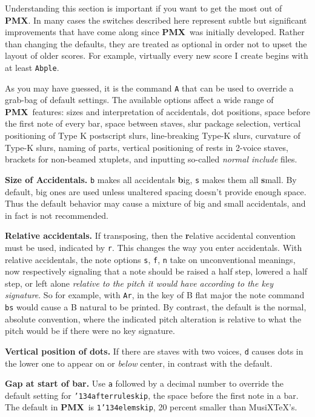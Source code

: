 \documentclass[11pt]{article}
\def\MusiXTeX{MusiX\TeX}
\def\bs{{\tt\char'134}}
\newcommand\PMXX{\textbf{PMX}}
\newcommand\PMX{\PMXX~}
\def\newfrom{2.59}  %
\def\NEW#1{\ifdim#1 pt<\newfrom pt\else%
\marginpar{\fbox{#1}}\fi}
\begin{document}
Understanding this section is important if you want to get the most out 
of \PMXX. In many 
cases the switches described here represent subtle but significant 
improvements that have come along since \PMX was initially developed. Rather 
than changing the defaults, they are treated as optional in order not to 
upset the layout of older scores. For example, virtually every new score I 
create begins with at least {\tt Abple}.

As you may have guessed, it is the command {\tt A} that can be used to 
override a grab-bag of default settings. The available options affect a 
wide range of \PMX features: sizes 
and interpretation of accidentals,
dot positions, space before the first note of every bar, space between staves,
slur package selection, vertical positioning of Type K postscript 
slurs, line-breaking Type-K slurs, curvature of Type-K slurs, 
naming of parts, vertical positioning of rests in 2-voice staves\NEW{2.6}, 
brackets for non-beamed xtuplets, and inputting so-called 
{\it normal include} files.

{\bf Size of Accidentals.}
{\tt b} makes all accidentals 
{\bf b}ig, {\tt s} makes them all {\bf s}mall.  By default, big ones are used 
unless unaltered spacing doesn't provide enough space.  Thus the default 
behavior may cause a mixture of big and small accidentals, and in fact is not
recommended.

{\bf Relative accidentals.}\label{ArDirective}
If transposing, then the {\bf r}elative accidental convention must be used, 
indicated by {\tt r}.  This changes the way you enter accidentals. With 
relative accidentals, the note options {\tt s}, {\tt f}, {\tt n} take on 
unconventional meanings, now respectively signaling that a note should be raised 
a half step, lowered a half step, or left alone {\it relative to the pitch 
it would have according to the key signature}. So for example, with {\tt Ar}, 
in the key of B flat major the note command {\tt bs} would cause a B natural 
to be printed. By contrast, the default is 
the normal, absolute convention, where the indicated pitch alteration is
relative to what the pitch would be if there were no key signature.
 
{\bf Vertical position of dots.}
If there are staves with two voices, {\tt d} causes dots in the 
lower one to appear on or {\it below} center, in contrast with the default.

{\bf Gap at start of bar.}
Use {\tt a} followed by a 
decimal number to override the default setting for \bs{\tt afterruleskip},
the space before the first note in a bar.  The default in \PMX is  
{\tt 1}\bs{\tt elemskip}, 20 percent smaller than \MusiXTeX{}'s. 
\end{document}
